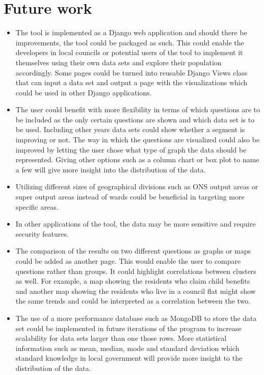 \section{Future work}
\begin{itemize}
	\item The tool is implemented as a Django web application and should there be improvements, the tool could be packaged as such. This could enable the developers in local councils or potential users of the tool to implement it themselves using their own data sets and explore their population accordingly. Some pages could be turned into reusable Django Views class that can input a data set and output a page with the visualizations which could be used in other Django applications.
	\item The user could benefit with more flexibility in terms of which questions are to be included as the only certain questions are shown and which data set is to be used. Including other years\textsc{} data sets could show whether a segment is improving or not. The way in which the questions are visualized could also be improved by letting the user chose what type of graph the data should be represented. Giving other options such as a column chart or box plot to name a few will give more insight into the distribution of the data.
	\item Utilizing different sizes of geographical divisions such as ONS\textsc{} output areas or super output areas instead of wards could be beneficial in targeting more specific areas.
	\item In other applications of the tool, the data may be more sensitive and require security features.
	\item The comparison of the results on two different questions as graphs or maps could be added as another page. This would enable the user to compare questions rather than groups. It could highlight correlations between clusters as well. For example, a map showing the residents who claim child benefits and another map showing the residents who live in a council flat might show the same trends and could be interpreted as a correlation between the two.
	\item The use of a more performance database such as MongoDB to store the data set could be implemented in future iterations of the program to increase scalability for data sets larger than one those rows.
More statistical information such as mean, median, mode and standard deviation which standard knowledge in local government will provide more insight to the distribution of the data.
\end{itemize}